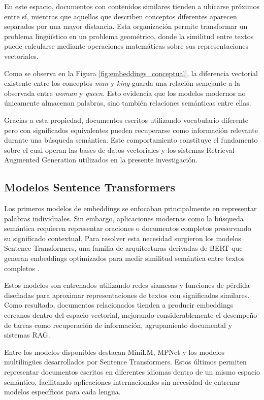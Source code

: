 En este espacio, documentos con contenidos similares tienden a ubicarse próximos entre sí, mientras que aquellos que describen conceptos diferentes aparecen separados por una mayor distancia. Esta organización permite transformar un problema lingüístico en un problema geométrico, donde la similitud entre textos puede calcularse mediante operaciones matemáticas sobre sus representaciones vectoriales.

Como se observa en la Figura \ref{fig:embeddings_conceptual}, la diferencia vectorial existente entre los conceptos \textit{man} y \textit{king} guarda una relación semejante a la observada entre \textit{woman} y \textit{queen}. Esto evidencia que los modelos modernos no únicamente almacenan palabras, sino también relaciones semánticas entre ellas.

Gracias a esta propiedad, documentos escritos utilizando vocabulario diferente pero con significados equivalentes pueden recuperarse como información relevante durante una búsqueda semántica. Este comportamiento constituye el fundamento sobre el cual operan las bases de datos vectoriales y los sistemas Retrieval-Augmented Generation utilizados en la presente investigación.

\subsection{Modelos Sentence Transformers}

Los primeros modelos de embeddings se enfocaban principalmente en representar palabras individuales. Sin embargo, aplicaciones modernas como la búsqueda semántica requieren representar oraciones o documentos completos preservando su significado contextual. Para resolver esta necesidad surgieron los modelos Sentence Transformers, una familia de arquitecturas derivadas de BERT que generan embeddings optimizados para medir similitud semántica entre textos completos \parencite{reimers2019sentence}.

Estos modelos son entrenados utilizando redes siamesas y funciones de pérdida diseñadas para aproximar representaciones de textos con significados similares. Como resultado, documentos relacionados tienden a producir embeddings cercanos dentro del espacio vectorial, mejorando considerablemente el desempeño de tareas como recuperación de información, agrupamiento documental y sistemas RAG.

Entre los modelos disponibles destacan MiniLM, MPNet y los modelos multilingües desarrollados por Sentence Transformers. Estos últimos permiten representar documentos escritos en diferentes idiomas dentro de un mismo espacio semántico, facilitando aplicaciones internacionales sin necesidad de entrenar modelos específicos para cada lengua.


